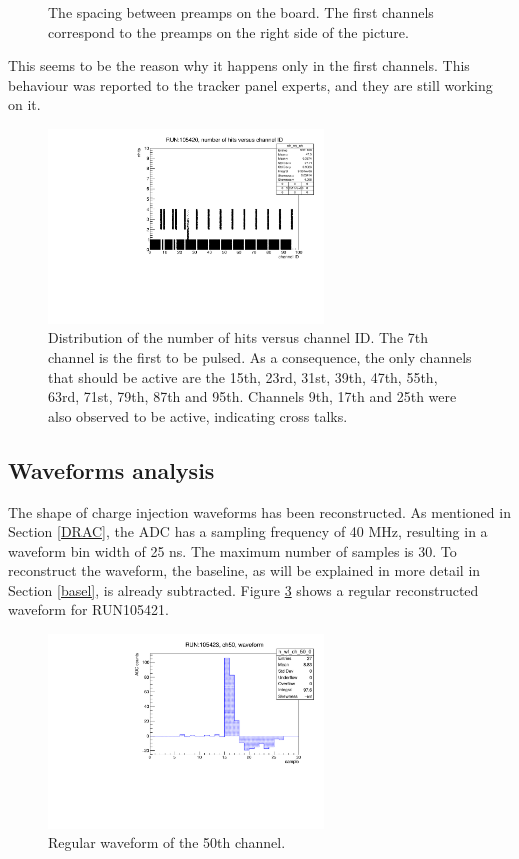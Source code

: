 \begin{figure}[!h]
  \caption{The spacing between preamps on the board. The first channels correspond to the preamps on the right side of the picture.}
 \label{fig:spacepreamps}
\end{figure}
This seems to be the reason why it happens only in the first channels. This behaviour was reported to the tracker panel experts, and they are still working on it.
\begin{figure}[!h]
  \centering
  \includegraphics[width=0.65\textwidth]{figures/pdf/run105420_nh_vs_ch.pdf}
  \caption{Distribution of the number of hits versus channel ID. The 7th channel is the first to be pulsed. 
  As a consequence, the only channels that should be active are the 15th, 23rd, 31st, 39th, 47th, 55th, 63rd, 71st, 79th, 87th and 95th. 
  Channels 9th, 17th and 25th were also observed to be active, indicating cross talks.}
 \label{fig:cross}
\end{figure}
\subsection{Waveforms analysis}\label{wf}
The shape of charge injection waveforms has been reconstructed. As mentioned in Section \ref{DRAC}, 
the ADC has a sampling frequency of 40 MHz, resulting in a waveform bin width of 25 ns. 
The maximum number of samples is 30. To reconstruct the waveform, the baseline, as will be 
explained in more detail in Section \ref{basel}, is already subtracted.
Figure \ref{fig:normalwf} shows a regular reconstructed waveform for RUN105421.
\begin{figure}[!h]
  \centering
  \includegraphics[width=0.65\textwidth]{figures/pdf/wf_ch50_0.pdf}
  \caption{Regular waveform of the 50th channel.}
 \label{fig:normalwf}
\end{figure}

